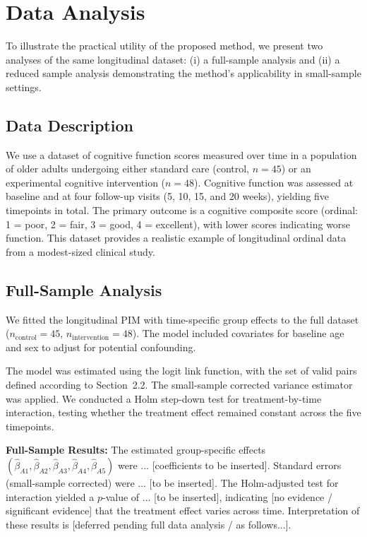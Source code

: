 \documentclass[alpha-refs]{wiley-article}
\begin{document}
\section{Data Analysis}
\label{analysis}

To illustrate the practical utility of the proposed method, we present two analyses of the same longitudinal dataset: (i) a full-sample analysis and (ii) a reduced sample analysis demonstrating the method's applicability in small-sample settings.

\subsection{Data Description}

We use a dataset of cognitive function scores measured over time in a population of older adults undergoing either standard care (control, $n=45$) or an experimental cognitive intervention ($n=48$). Cognitive function was assessed at baseline and at four follow-up visits (5, 10, 15, and 20 weeks), yielding five timepoints in total. The primary outcome is a cognitive composite score (ordinal: 1 = poor, 2 = fair, 3 = good, 4 = excellent), with lower scores indicating worse function. This dataset provides a realistic example of longitudinal ordinal data from a modest-sized clinical study.

\subsection{Full-Sample Analysis}

We fitted the longitudinal PIM with time-specific group effects to the full dataset ($n_{\text{control}}=45$, $n_{\text{intervention}}=48$). The model included covariates for baseline age and sex to adjust for potential confounding. 

The model was estimated using the logit link function, with the set of valid pairs defined according to Section~2.2. The small-sample corrected variance estimator was applied. We conducted a Holm step-down test for treatment-by-time interaction, testing whether the treatment effect remained constant across the five timepoints.

\textbf{Full-Sample Results:} The estimated group-specific effects $(\hat{\beta}_{A1}, \hat{\beta}_{A2}, \hat{\beta}_{A3}, \hat{\beta}_{A4}, \hat{\beta}_{A5})$ were ... [coefficients to be inserted]. Standard errors (small-sample corrected) were ... [to be inserted]. The Holm-adjusted test for interaction yielded a $p$-value of ... [to be inserted], indicating [no evidence / significant evidence] that the treatment effect varies across time. Interpretation of these results is [deferred pending full data analysis / as follows...].
\end{document}

